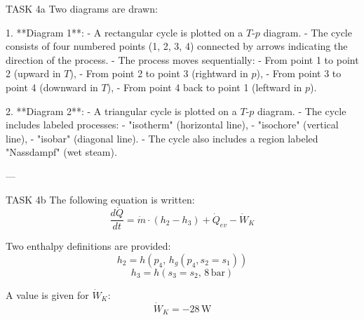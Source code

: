 TASK 4a  
Two diagrams are drawn:  

1. **Diagram 1**:  
   - A rectangular cycle is plotted on a \( T \)-\( p \) diagram.  
   - The cycle consists of four numbered points (1, 2, 3, 4) connected by arrows indicating the direction of the process.  
   - The process moves sequentially:  
     - From point 1 to point 2 (upward in \( T \)),  
     - From point 2 to point 3 (rightward in \( p \)),  
     - From point 3 to point 4 (downward in \( T \)),  
     - From point 4 back to point 1 (leftward in \( p \)).  

2. **Diagram 2**:  
   - A triangular cycle is plotted on a \( T \)-\( p \) diagram.  
   - The cycle includes labeled processes:  
     - "isotherm" (horizontal line),  
     - "isochore" (vertical line),  
     - "isobar" (diagonal line).  
   - The cycle also includes a region labeled "Nassdampf" (wet steam).  

---

TASK 4b  
The following equation is written:  
\[
\frac{d\dot{Q}}{dt} = \dot{m} \cdot (h_2 - h_3) + \dot{Q}_{ev} - \dot{W}_K
\]  

Two enthalpy definitions are provided:  
\[
h_2 = h(p_4, \, h_g(p_4, s_2 = s_1))
\]  
\[
h_3 = h(s_3 = s_2, \, 8 \, \text{bar})
\]  

A value is given for \( \dot{W}_K \):  
\[
\dot{W}_K = -28 \, \text{W}
\]  